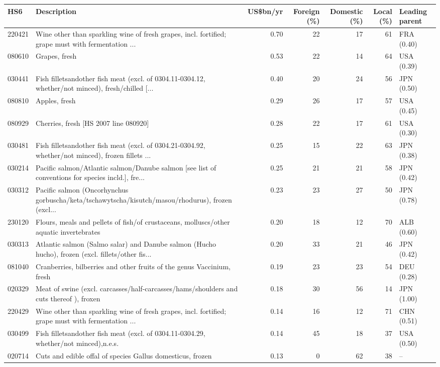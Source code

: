 \begin{tabular}{@{}l p{6.4cm} r r r r l@{}}
\toprule
HS6 & Description & US\$bn/yr & Foreign (\%) & Domestic (\%) & Local (\%) & Leading parent \\
\midrule
220421 & Wine other than sparkling wine of fresh grapes, incl. fortified; grape must with fermentation ... & 0.70 & 22 & 17 & 61 & FRA (0.40) \\
080610 & Grapes, fresh & 0.53 & 22 & 14 & 64 & USA (0.39) \\
030441 & Fish filletsandother fish meat (excl. of 0304.11-0304.12, whether/\allowbreak{}not minced), fresh/\allowbreak{}chilled [... & 0.40 & 20 & 24 & 56 & JPN (0.50) \\
080810 & Apples, fresh & 0.29 & 26 & 17 & 57 & USA (0.45) \\
080929 & Cherries, fresh [HS 2007 line 080920] & 0.28 & 22 & 17 & 61 & USA (0.30) \\
030481 & Fish filletsandother fish meat (excl. of 0304.21-0304.92, whether/\allowbreak{}not minced), frozen fillets ... & 0.25 & 15 & 22 & 63 & JPN (0.38) \\
030214 & Pacific salmon/\allowbreak{}Atlantic salmon/\allowbreak{}Danube salmon [see list of conventions for species incld.], fre... & 0.25 & 21 & 21 & 58 & JPN (0.42) \\
030312 & Pacific salmon (Oncorhynchus gorbuscha/\allowbreak{}keta/\allowbreak{}tschawytscha/\allowbreak{}kisutch/\allowbreak{}masou/\allowbreak{}rhodurus), frozen (excl... & 0.23 & 23 & 27 & 50 & JPN (0.78) \\
230120 & Flours, meals and pellets of fish/\allowbreak{}of crustaceans, molluscs/\allowbreak{}other aquatic invertebrates & 0.20 & 18 & 12 & 70 & ALB (0.60) \\
030313 & Atlantic salmon (Salmo salar) and Danube salmon (Hucho hucho), frozen (excl. fillets/\allowbreak{}other fis... & 0.20 & 33 & 21 & 46 & JPN (0.42) \\
081040 & Cranberries, bilberries and other fruits of the genus Vaccinium, fresh & 0.19 & 23 & 23 & 54 & DEU (0.28) \\
020329 & Meat of swine (excl. carcasses/\allowbreak{}half-carcasses/\allowbreak{}hams/\allowbreak{}shoulders and cuts thereof ), froxen & 0.18 & 30 & 56 & 14 & JPN (1.00) \\
220429 & Wine other than sparkling wine of fresh grapes, incl. fortified; grape must with fermentation ... & 0.14 & 16 & 12 & 71 & CHN (0.51) \\
030499 & Fish filletsandother fish meat (excl. of 0304.11-0304.29, whether/\allowbreak{}not minced),n.e.s. & 0.14 & 45 & 18 & 37 & USA (0.50) \\
020714 & Cuts and edible offal of species Gallus domesticus, frozen & 0.13 & 0 & 62 & 38 & -- \\
\bottomrule
\end{tabular}
